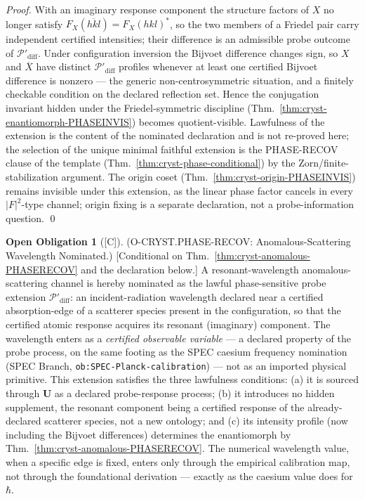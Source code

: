 \documentclass[12pt,oneside]{amsbook}
\theoremstyle{plain}
\theoremstyle{definition}
\newtheorem{obligation}[theorem]{Open Obligation}
\theoremstyle{remark}
\newcommand{\status}[1]{\textup{[#1]}}
\begin{document}
\begin{proof}
With an imaginary response component the structure factors of $X$
no longer satisfy $F_X(\overline{hkl}) = F_X(hkl)^*$, so the two
members of a Friedel pair carry independent certified intensities;
their difference is an admissible probe outcome of
$\mathcal{P}'_{\mathrm{diff}}$.  Under configuration inversion
the Bijvoet difference changes sign, so $X$ and $\overline{X}$
have distinct $\mathcal{P}'_{\mathrm{diff}}$ profiles whenever at
least one certified Bijvoet difference is nonzero --- the
generic non-centrosymmetric situation, and a finitely checkable
condition on the declared reflection set.  Hence the conjugation
invariant hidden under the Friedel-symmetric discipline
(Thm.~\ref{thm:cryst-enantiomorph-PHASEINVIS}) becomes
quotient-visible.  Lawfulness of the extension is the content of
the nominated declaration and is not re-proved here; the selection
of the unique minimal faithful extension is the PHASE-RECOV clause
of the template (Thm.~\ref{thm:cryst-phase-conditional}) by the
Zorn/finite-stabilization argument.  The origin coset
(Thm.~\ref{thm:cryst-origin-PHASEINVIS}) remains invisible under
this extension, as the linear phase factor cancels in every
$|F|^2$-type channel; origin fixing is a separate declaration, not
a probe-information question. \qed
\end{proof}

\begin{obligation}[\status{C}]\label{ob:cryst-anomalous-nomination}
\textup{(O-CRYST.PHASE-RECOV: Anomalous-Scattering Wavelength
Nominated.)}
\textup{[Conditional on Thm.~\ref{thm:cryst-anomalous-PHASERECOV}
and the declaration below.]}
A resonant-wavelength anomalous-scattering channel is hereby
nominated as the lawful phase-sensitive probe extension
$\mathcal{P}'_{\mathrm{diff}}$: an incident-radiation wavelength
declared near a certified absorption-edge of a scatterer species
present in the configuration, so that the certified atomic response
acquires its resonant (imaginary) component.  The wavelength enters
as a \emph{certified observable variable} --- a declared property of
the probe process, on the same footing as the SPEC caesium frequency
nomination (SPEC Branch, \texttt{ob:SPEC-Planck-calibration}) --- not
as an imported physical primitive.  This extension satisfies the
three lawfulness conditions: (a) it is sourced through $\mathbf{U}$
as a declared probe-response process; (b) it introduces no hidden
supplement, the resonant component being a certified response of the
already-declared scatterer species, not a new ontology; and (c) its
intensity profile (now including the Bijvoet differences) determines
the enantiomorph by Thm.~\ref{thm:cryst-anomalous-PHASERECOV}.  The
numerical wavelength value, when a specific edge is fixed, enters only
through the empirical calibration map, not through the foundational
derivation --- exactly as the caesium value does for $\hbar$.
\end{obligation}
\end{document}

